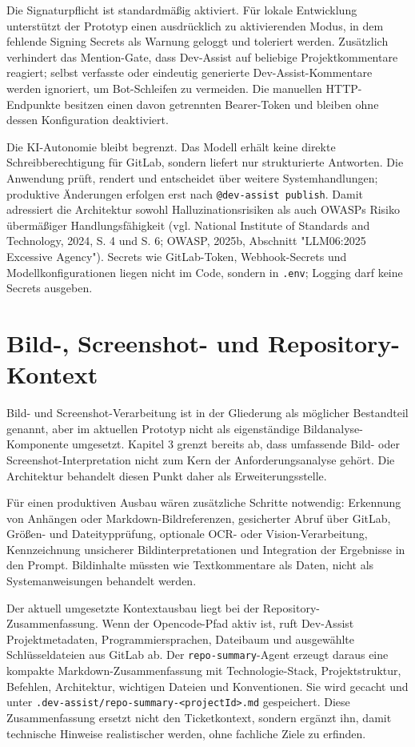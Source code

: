 \documentclass[12pt,a4paper,oneside]{scrreprt}
\begin{document}
Die Signaturpflicht ist standardmäßig aktiviert. Für lokale Entwicklung unterstützt der Prototyp einen ausdrücklich zu aktivierenden Modus, in dem fehlende Signing Secrets als Warnung geloggt und toleriert werden. Zusätzlich verhindert das Mention-Gate, dass Dev-Assist auf beliebige Projektkommentare reagiert; selbst verfasste oder eindeutig generierte Dev-Assist-Kommentare werden ignoriert, um Bot-Schleifen zu vermeiden. Die manuellen HTTP-Endpunkte besitzen einen davon getrennten Bearer-Token und bleiben ohne dessen Konfiguration deaktiviert.

Die KI-Autonomie bleibt begrenzt. Das Modell erhält keine direkte Schreibberechtigung für GitLab, sondern liefert nur strukturierte Antworten. Die Anwendung prüft, rendert und entscheidet über weitere Systemhandlungen; produktive Änderungen erfolgen erst nach \texttt{@dev-assist publish}. Damit adressiert die Architektur sowohl Halluzinationsrisiken als auch OWASPs Risiko übermäßiger Handlungsfähigkeit (vgl. National Institute of Standards and Technology, 2024, S. 4 und S. 6; OWASP, 2025b, Abschnitt "LLM06:2025 Excessive Agency"). Secrets wie GitLab-Token, Webhook-Secrets und Modellkonfigurationen liegen nicht im Code, sondern in \texttt{.env}; Logging darf keine Secrets ausgeben.

\section{Bild-, Screenshot- und Repository-Kontext}

Bild- und Screenshot-Verarbeitung ist in der Gliederung als möglicher Bestandteil genannt, aber im aktuellen Prototyp nicht als eigenständige Bildanalyse-Komponente umgesetzt. Kapitel 3 grenzt bereits ab, dass umfassende Bild- oder Screenshot-Interpretation nicht zum Kern der Anforderungsanalyse gehört. Die Architektur behandelt diesen Punkt daher als Erweiterungsstelle.

Für einen produktiven Ausbau wären zusätzliche Schritte notwendig: Erkennung von Anhängen oder Markdown-Bildreferenzen, gesicherter Abruf über GitLab, Größen- und Dateitypprüfung, optionale OCR- oder Vision-Verarbeitung, Kennzeichnung unsicherer Bildinterpretationen und Integration der Ergebnisse in den Prompt. Bildinhalte müssten wie Textkommentare als Daten, nicht als Systemanweisungen behandelt werden.

Der aktuell umgesetzte Kontextausbau liegt bei der Repository-Zusammenfassung. Wenn der Opencode-Pfad aktiv ist, ruft Dev-Assist Projektmetadaten, Programmiersprachen, Dateibaum und ausgewählte Schlüsseldateien aus GitLab ab. Der \texttt{repo-summary}-Agent erzeugt daraus eine kompakte Markdown-Zusammenfassung mit Technologie-Stack, Projektstruktur, Befehlen, Architektur, wichtigen Dateien und Konventionen. Sie wird gecacht und unter \texttt{.dev-assist/repo-summary-\textless{}projectId\textgreater{}.md} gespeichert. Diese Zusammenfassung ersetzt nicht den Ticketkontext, sondern ergänzt ihn, damit technische Hinweise realistischer werden, ohne fachliche Ziele zu erfinden.
\end{document}
